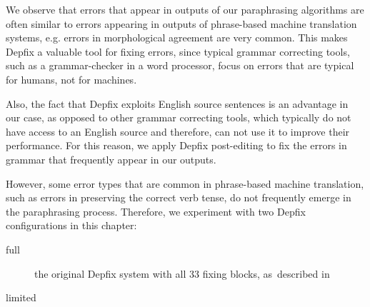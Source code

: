 We observe that errors that appear in outputs of our paraphrasing algorithms 
are often similar to errors appearing in outputs of phrase-based machine 
translation systems, e.g. errors in morphological agreement are very common.
This makes Depfix a valuable tool for fixing  errors, since typical
grammar correcting tools, such as a grammar-checker in a word processor,
focus on errors that are typical for humans, not for machines.

Also, the fact that Depfix exploits English source sentences is an advantage 
in our case, as opposed to other grammar correcting tools, which typically do 
not have access to an English source and therefore, can not use it to improve 
their performance. For this reason, we apply Depfix post-editing to fix the 
errors in grammar that frequently appear in our outputs.

However, some error types that are common in phrase-based machine translation, 
such as errors in preserving the correct verb tense, do not frequently emerge in the 
paraphrasing process. Therefore, we experiment with two Depfix configurations 
in this chapter:
\begin{description}
\item[full] the original Depfix system with all 33 fixing blocks,
as~described in \cite{rosa:mgr}
\item[limited] 
\end{description}


